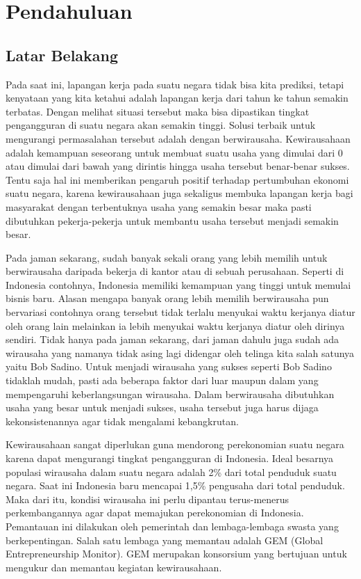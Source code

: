 \chapter{Pendahuluan}
\label{chap:intro}
   
\section{Latar Belakang}
\label{sec:label}

Pada saat ini, lapangan kerja pada suatu negara tidak bisa kita prediksi, tetapi kenyataan yang kita ketahui adalah lapangan kerja dari tahun ke tahun semakin terbatas. Dengan melihat situasi tersebut maka bisa dipastikan tingkat pengangguran di suatu negara akan semakin tinggi. Solusi terbaik untuk mengurangi permasalahan tersebut adalah dengan berwirausaha. Kewirausahaan adalah kemampuan seseorang untuk membuat suatu usaha yang dimulai dari 0 atau dimulai dari bawah yang dirintis hingga usaha tersebut benar-benar sukses. Tentu saja hal ini memberikan pengaruh positif terhadap pertumbuhan ekonomi suatu negara, karena kewirausahaan juga sekaligus membuka lapangan kerja bagi masyarakat dengan terbentuknya usaha yang semakin besar maka pasti dibutuhkan pekerja-pekerja untuk membantu usaha tersebut menjadi semakin besar.

 
Pada jaman sekarang, sudah banyak sekali orang yang lebih memilih untuk berwirausaha daripada bekerja di kantor atau di sebuah perusahaan. Seperti di Indonesia contohnya, Indonesia memiliki kemampuan yang tinggi untuk memulai bisnis baru. Alasan mengapa banyak orang lebih memilih berwirausaha pun bervariasi contohnya orang tersebut tidak terlalu menyukai waktu kerjanya diatur oleh orang lain melainkan ia lebih menyukai waktu kerjanya diatur oleh dirinya sendiri. Tidak hanya pada jaman sekarang, dari jaman dahulu juga sudah ada wirausaha yang namanya tidak asing lagi didengar oleh telinga kita salah satunya yaitu Bob Sadino. Untuk menjadi wirausaha yang sukses seperti Bob Sadino tidaklah mudah, pasti ada beberapa faktor dari luar maupun dalam yang mempengaruhi keberlangsungan wirausaha. Dalam berwirausaha dibutuhkan usaha yang besar untuk menjadi sukses, usaha tersebut juga harus dijaga kekonsistenannya agar tidak mengalami kebangkrutan.


Kewirausahaan sangat diperlukan guna mendorong perekonomian suatu negara karena dapat mengurangi tingkat pengangguran di Indonesia.  Ideal besarnya populasi wirausaha dalam suatu negara adalah 2\% dari total penduduk suatu negara. Saat ini Indonesia baru mencapai 1,5\% pengusaha dari total penduduk. Maka dari itu, kondisi wirausaha ini perlu dipantau terus-menerus perkembangannya agar dapat memajukan perekonomian di Indonesia. Pemantauan ini dilakukan oleh pemerintah dan lembaga-lembaga swasta yang berkepentingan. Salah satu lembaga yang memantau adalah GEM (Global Entrepreneurship Monitor). GEM merupakan konsorsium yang bertujuan untuk mengukur dan memantau kegiatan kewirausahaan. 



